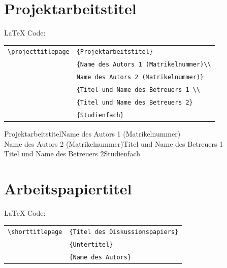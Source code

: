 \documentclass[english, trackchanges, hyperref, ngerman ,pdf, mp, mppdf]{wise}
\newcommand\code[1]{\texttt{#1}}
\newcommand\command[1]{\code{\textbackslash{}#1}}
\begin{document}
\begin{appendix}
\begin{appendices}
\clearpage



\section{Projektarbeitstitel}\label{sec:titelblatt_projektarbeiten}

\LaTeX{} Code:

\vspace{0.375cm}
\begin{center}\begin{tabular}{ll}
\command{projecttitlepage} & \code{\{Projektarbeitstitel\}}
\tabularnewline & \code{\{Name des Autors 1 (Matrikelnummer)\textbackslash\textbackslash }
\tabularnewline & \code{Name des Autors 2 (Matrikelnummer)\} } 
\tabularnewline & \code{\{Titel und Name des Betreuers 1 \textbackslash\textbackslash }
\tabularnewline & \code{\{Titel und Name des Betreuers 2\}}
\tabularnewline & \code{\{Studienfach\} } \\
\end{tabular}\end{center}
\vspace{0.375cm}

\clearpage

\projecttitlepage
{Projektarbeitstitel}{Name des Autors 1 (Matrikelnummer)\\ Name des Autors 2 (Matrikelnummer)}{Titel und Name des Betreuers 1 \\ Titel und Name des  Betreuers 2}{Studienfach} 


\section{Arbeitspapiertitel}\label{sec:titelblatt_diskussionspapiere}

\LaTeX{} Code:

\vspace{0.375cm}
\begin{center}\begin{tabular}{ll}
\command{shorttitlepage}&
\code{\{Titel des Diskussionspapiers\}}\\
&
\code{\{Untertitel\}}\\
&
\code{\{Name des Autors\}}\\
\end{tabular}\end{center}
\vspace{0.375cm}

\clearpage
%

\end{appendices}\end{appendix}
\end{document}
